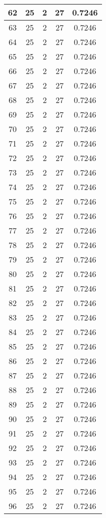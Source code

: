 \documentclass[letterpaper, 12pt]{article}
\begin{document}
\begin{longtable}{|c|c|c|c|c|}
\hline
62 & 25 & 2 & 27 & 0.7246 \\
\hline
63 & 25 & 2 & 27 & 0.7246 \\
\hline
64 & 25 & 2 & 27 & 0.7246 \\
\hline
65 & 25 & 2 & 27 & 0.7246 \\
\hline
66 & 25 & 2 & 27 & 0.7246 \\
\hline
67 & 25 & 2 & 27 & 0.7246 \\
\hline
68 & 25 & 2 & 27 & 0.7246 \\
\hline
69 & 25 & 2 & 27 & 0.7246 \\
\hline
70 & 25 & 2 & 27 & 0.7246 \\
\hline
71 & 25 & 2 & 27 & 0.7246 \\
\hline
72 & 25 & 2 & 27 & 0.7246 \\
\hline
73 & 25 & 2 & 27 & 0.7246 \\
\hline
74 & 25 & 2 & 27 & 0.7246 \\
\hline
75 & 25 & 2 & 27 & 0.7246 \\
\hline
76 & 25 & 2 & 27 & 0.7246 \\
\hline
77 & 25 & 2 & 27 & 0.7246 \\
\hline
78 & 25 & 2 & 27 & 0.7246 \\
\hline
79 & 25 & 2 & 27 & 0.7246 \\
\hline
80 & 25 & 2 & 27 & 0.7246 \\
\hline
81 & 25 & 2 & 27 & 0.7246 \\
\hline
82 & 25 & 2 & 27 & 0.7246 \\
\hline
83 & 25 & 2 & 27 & 0.7246 \\
\hline
84 & 25 & 2 & 27 & 0.7246 \\
\hline
85 & 25 & 2 & 27 & 0.7246 \\
\hline
86 & 25 & 2 & 27 & 0.7246 \\
\hline
87 & 25 & 2 & 27 & 0.7246 \\
\hline
88 & 25 & 2 & 27 & 0.7246 \\
\hline
89 & 25 & 2 & 27 & 0.7246 \\
\hline
90 & 25 & 2 & 27 & 0.7246 \\
\hline
91 & 25 & 2 & 27 & 0.7246 \\
\hline
92 & 25 & 2 & 27 & 0.7246 \\
\hline
93 & 25 & 2 & 27 & 0.7246 \\
\hline
94 & 25 & 2 & 27 & 0.7246 \\
\hline
95 & 25 & 2 & 27 & 0.7246 \\
\hline
96 & 25 & 2 & 27 & 0.7246 \\

\end{longtable}
\end{document}
